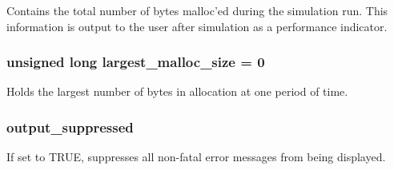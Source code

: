 Contains the total number of bytes malloc'ed during the simulation run. This information is output to the user after simulation as a performance indicator. 
\subsubsection{\setlength{\rightskip}{0pt plus 5cm}unsigned long largest\_\-malloc\_\-size = 0}\label{util_8c_a2}


Holds the largest number of bytes in allocation at one period of time. 
\subsubsection{ output\_\-suppressed}\label{util_8c_a0}


If set to TRUE, suppresses all non-fatal error messages from being displayed. 